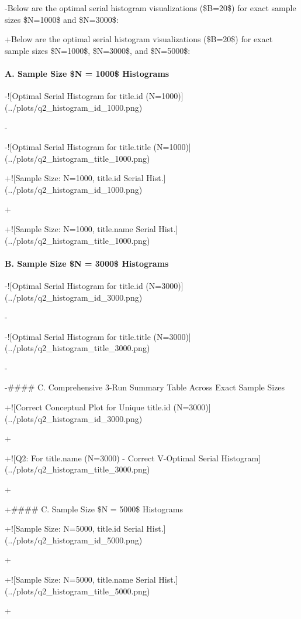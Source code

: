 \documentclass[11pt,a4paper]{article}
\begin{document}
-Below are the optimal serial histogram visualizations (\$B=20\$) for exact sample sizes \$N=1000\$ and \$N=3000\$:

+Below are the optimal serial histogram visualizations (\$B=20\$) for exact sample sizes \$N=1000\$, \$N=3000\$, and \$N=5000\$:


\paragraph{A. Sample Size \$N = 1000\$ Histograms}
-![Optimal Serial Histogram for title.id (N=1000)](../plots/q2\_histogram\_id\_1000.png)

-

-![Optimal Serial Histogram for title.title (N=1000)](../plots/q2\_histogram\_title\_1000.png)

+![Sample Size: N=1000, title.id Serial Hist.](../plots/q2\_histogram\_id\_1000.png)

+

+![Sample Size: N=1000, title.name Serial Hist.](../plots/q2\_histogram\_title\_1000.png)


\paragraph{B. Sample Size \$N = 3000\$ Histograms}
-![Optimal Serial Histogram for title.id (N=3000)](../plots/q2\_histogram\_id\_3000.png)

-

-![Optimal Serial Histogram for title.title (N=3000)](../plots/q2\_histogram\_title\_3000.png)

-

-\#\#\#\# C. Comprehensive 3-Run Summary Table Across Exact Sample Sizes

+![Correct Conceptual Plot for Unique title.id (N=3000)](../plots/q2\_histogram\_id\_3000.png)

+

+![Q2: For title.name (N=3000) - Correct V-Optimal Serial Histogram](../plots/q2\_histogram\_title\_3000.png)

+

+\#\#\#\# C. Sample Size \$N = 5000\$ Histograms

+![Sample Size: N=5000, title.id Serial Hist.](../plots/q2\_histogram\_id\_5000.png)

+

+![Sample Size: N=5000, title.name Serial Hist.](../plots/q2\_histogram\_title\_5000.png)

+
\end{document}
